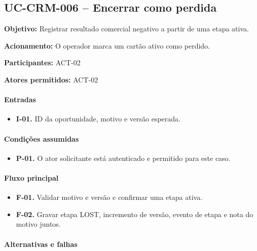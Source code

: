 \documentclass[10pt,a4paper]{article}
\begin{document}
\subsection{UC-CRM-006 -- Encerrar como perdida}

\textbf{Objetivo:} Registrar resultado comercial negativo a partir de uma etapa ativa.

\textbf{Acionamento:} O operador marca um cartão ativo como perdido.

\textbf{Participantes:} ACT-02

\textbf{Atores permitidos:} ACT-02

\paragraph{Entradas}

\begin{itemize}

\item \textbf{I-01.} ID da oportunidade, motivo e versão esperada.

\end{itemize}

\paragraph{Condições assumidas}

\begin{itemize}

\item \textbf{P-01.} O ator solicitante está autenticado e permitido para este caso.

\end{itemize}

\paragraph{Fluxo principal}

\begin{itemize}

\item \textbf{F-01.} Validar motivo e versão e confirmar uma etapa ativa.

\item \textbf{F-02.} Gravar etapa LOST, incremento de versão, evento de etapa e nota do motivo juntos.

\end{itemize}

\paragraph{Alternativas e falhas}
\end{document}
